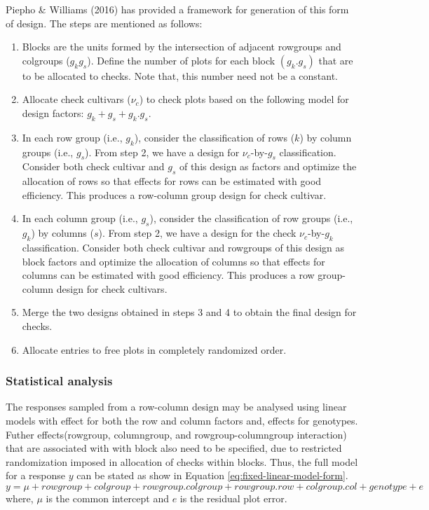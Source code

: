 \documentclass[12pt,oneside]{dukestatscithesis} %
\begin{document}
Piepho \& Williams (2016) has provided a framework for generation of this form of design. The steps are mentioned as follows:
\begin{enumerate}
\def\labelenumi{\arabic{enumi}.}
\item
  Blocks are the units formed by the intersection of adjacent rowgroups and colgroups (\(g_kg_s\)). Define the number of plots for each block \((g_k.g_s)\) that are to be allocated to checks. Note that, this number need not be a constant.
\item
  Allocate check cultivars (\(\nu_c\)) to check plots based on the following model for design factors: \(g_k + g_s + g_k.g_s\).
\item
  In each row group (i.e., \(g_k\)), consider the classification of rows (\(k\)) by column groups (i.e., \(g_s\)). From step 2, we have a design for \(\nu_c\)-by-\(g_s\) classification. Consider both check cultivar and \(g_s\) of this design as factors and optimize the allocation of rows so that effects for rows can be estimated with good efficiency. This produces a row-column group design for check cultivar.
\item
  In each column group (i.e., \(g_s\)), consider the classification of row groups (i.e., \(g_k\)) by columns (\(s\)). From step 2, we have a design for the check \(\nu_c\)-by-\(g_k\) classification. Consider both check cultivar and rowgroups of this design as block factors and optimize the allocation of columns so that effects for columns can be estimated with good efficiency. This produces a row group-column design for check cultivars.
\item
  Merge the two designs obtained in steps 3 and 4 to obtain the final design for checks.
\item
  Allocate entries to free plots in completely randomized order.
\end{enumerate}
\hypertarget{stat-an-aug-row-col}{%
\subsubsection{Statistical analysis}\label{stat-an-aug-row-col}}

The responses sampled from a row-column design may be analysed using linear models with effect for both the row and column factors and, effects for genotypes. Futher effects(rowgroup, columngroup, and rowgroup-columngroup interaction) that are associated with with block also need to be specified, due to restricted randomization imposed in allocation of checks within blocks. Thus, the full model for a response \(y\) can be stated as show in Equation \eqref{eq:fixed-linear-model-form}.
\begin{equation}
y = \mu + rowgroup + colgroup + 
rowgroup.colgroup + rowgroup.row + colgroup.col + 
genotype + e
\label{eq:fixed-linear-model-form}
\end{equation}
where, \(\mu\) is the common intercept and \(e\) is the residual plot error.
\end{document}
